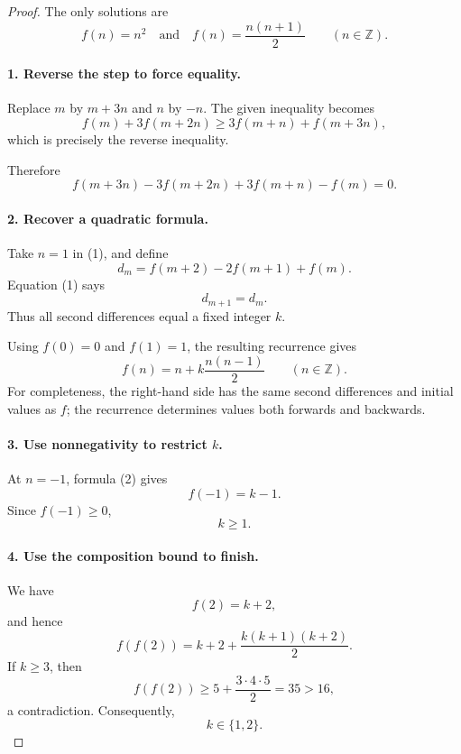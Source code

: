 
\begin{dlsummary}[title={\bfseries Solution 55. The Reversible Difference},breakable]

\begin{proof}
The only solutions are
\[
\boxed{
f(n)=n^2
\quad\text{and}\quad
f(n)=\frac{n(n+1)}2
\qquad(n\in\mathbb Z).
}
\]

\paragraph{1. Reverse the step to force equality.}

Replace \(m\) by \(m+3n\) and \(n\) by \(-n\). The given inequality becomes
\[
f(m)+3f(m+2n)
\ge3f(m+n)+f(m+3n),
\]
which is precisely the reverse inequality.

Therefore
\[
\boxed{
f(m+3n)-3f(m+2n)+3f(m+n)-f(m)=0.
} \tag{1}
\]

\paragraph{2. Recover a quadratic formula.}

Take \(n=1\) in (1), and define
\[
d_m=f(m+2)-2f(m+1)+f(m).
\]
Equation (1) says
\[
d_{m+1}=d_m.
\]
Thus all second differences equal a fixed integer \(k\).

Using \(f(0)=0\) and \(f(1)=1\), the resulting recurrence gives
\[
\boxed{
f(n)=n+k\frac{n(n-1)}2
\qquad(n\in\mathbb Z).
} \tag{2}
\]
For completeness, the right-hand side has the same second differences and initial values as \(f\); the recurrence determines values both forwards and backwards.

\paragraph{3. Use nonnegativity to restrict \(k\).}

At \(n=-1\), formula (2) gives
\[
f(-1)=k-1.
\]
Since \(f(-1)\ge0\),
\[
\boxed{k\ge1.}
\]

\paragraph{4. Use the composition bound to finish.}

We have
\[
f(2)=k+2,
\]
and hence
\[
f(f(2))
=k+2+\frac{k(k+1)(k+2)}2.
\]
If \(k\ge3\), then
\[
f(f(2))\ge5+\frac{3\cdot4\cdot5}{2}=35>16,
\]
a contradiction. Consequently,
\[
k\in\{1,2\}.
\]


\end{proof}
\end{dlsummary}
